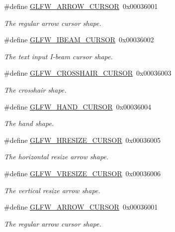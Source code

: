 \begin{DoxyCompactItemize}
\#define \hyperlink{group__shapes_ga8ab0e717245b85506cb0eaefdea39d0a}{G\+L\+F\+W\+\_\+\+A\+R\+R\+O\+W\+\_\+\+C\+U\+R\+S\+OR}~0x00036001
\begin{DoxyCompactList}\small\item\em The regular arrow cursor shape. \end{DoxyCompactList}\item 
\#define \hyperlink{group__shapes_ga36185f4375eaada1b04e431244774c86}{G\+L\+F\+W\+\_\+\+I\+B\+E\+A\+M\+\_\+\+C\+U\+R\+S\+OR}~0x00036002
\begin{DoxyCompactList}\small\item\em The text input I-\/beam cursor shape. \end{DoxyCompactList}\item 
\#define \hyperlink{group__shapes_ga8af88c0ea05ab9e8f9ac1530e8873c22}{G\+L\+F\+W\+\_\+\+C\+R\+O\+S\+S\+H\+A\+I\+R\+\_\+\+C\+U\+R\+S\+OR}~0x00036003
\begin{DoxyCompactList}\small\item\em The crosshair shape. \end{DoxyCompactList}\item 
\#define \hyperlink{group__shapes_ga1db35e20849e0837c82e3dc1fd797263}{G\+L\+F\+W\+\_\+\+H\+A\+N\+D\+\_\+\+C\+U\+R\+S\+OR}~0x00036004
\begin{DoxyCompactList}\small\item\em The hand shape. \end{DoxyCompactList}\item 
\#define \hyperlink{group__shapes_gabb3eb0109f11bb808fc34659177ca962}{G\+L\+F\+W\+\_\+\+H\+R\+E\+S\+I\+Z\+E\+\_\+\+C\+U\+R\+S\+OR}~0x00036005
\begin{DoxyCompactList}\small\item\em The horizontal resize arrow shape. \end{DoxyCompactList}\item 
\#define \hyperlink{group__shapes_gaf024f0e1ff8366fb2b5c260509a1fce5}{G\+L\+F\+W\+\_\+\+V\+R\+E\+S\+I\+Z\+E\+\_\+\+C\+U\+R\+S\+OR}~0x00036006
\begin{DoxyCompactList}\small\item\em The vertical resize arrow shape. \end{DoxyCompactList}\item 
\#define \hyperlink{group__shapes_ga8ab0e717245b85506cb0eaefdea39d0a}{G\+L\+F\+W\+\_\+\+A\+R\+R\+O\+W\+\_\+\+C\+U\+R\+S\+OR}~0x00036001
\begin{DoxyCompactList}\small\item\em The regular arrow cursor shape. \end{DoxyCompactList}\item 

\end{DoxyCompactItemize}
